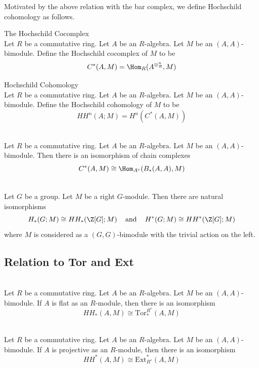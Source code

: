 \documentclass[a4paper]{article}
\begin{document}
Motivated by the above relation with the bar complex, we define Hochschild cohomology as follows. 

\begin{defn}{The Hochschild Cocomplex}{}\\
Let $R$ be a commutative ring. Let $A$ be an $R$-algebra. Let $M$ be an $(A,A)$-bimodule. Define the Hochschild cocomplex of $M$ to be $$C^\ast(A,M)=\Hom_R(A^{\otimes_R^n},M)$$
\end{defn}

\begin{defn}{Hochschild Cohomology}{}\\
Let $R$ be a commutative ring. Let $A$ be an $R$-algebra. Let $M$ be an $(A,A)$-bimodule. Define the Hochschild cohomology of $M$ to be $$HH^n(A;M)=H^n(C^\ast(A,M))$$
\end{defn}

\begin{prp}{}{}\\
Let $R$ be a commutative ring. Let $A$ be an $R$-algebra. Let $M$ be an $(A,A)$-bimodule. Then there is an isomorphism of chain complexes $$C^\ast(A,M)\cong\Hom_{A^e}(B_\ast(A,A),M)$$
\end{prp}

\begin{lmm}{}{}\\
Let $G$ be a group. Let $M$ be a right $G$-module. Then there are natural isomorphisms $$H_\ast(G;M)\cong HH_\ast(\Z[G];M)\;\;\;\text{ and }\;\;\; H^\ast(G;M)\cong HH^\ast(\Z[G];M)$$ where $M$ is considered as a $(G,G)$-bimodule with the trivial action on the left. 
\end{lmm}

\subsection{Relation to Tor and Ext}
\begin{prp}{}{}\\
Let $R$ be a commutative ring. Let $A$ be an $R$-algebra. Let $M$ be an $(A,A)$-bimodule. If $A$ is flat as an $R$-module, then there is an isomorphism $$HH_\ast(A,M)\cong\text{Tor}_\ast^{R^e}(A,M)$$
\end{prp}

\begin{prp}{}{}\\
Let $R$ be a commutative ring. Let $A$ be an $R$-algebra. Let $M$ be an $(A,A)$-bimodule. If $A$ is projective as an $R$-module, then there is an isomorphism $$HH^\ast(A,M)\cong\text{Ext}_{R^e}^\ast(A,M)$$
\end{prp}
\end{document}
